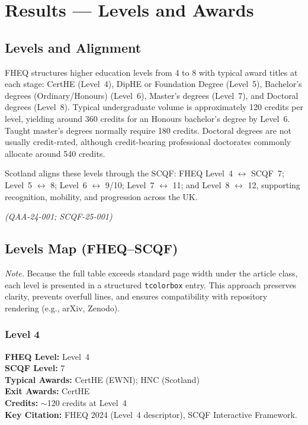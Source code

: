 \section{Results — Levels and Awards}

\subsection{Levels and Alignment}

FHEQ structures higher education levels from 4 to 8 with typical award titles at each stage: 
CertHE (Level~4), DipHE or Foundation Degree (Level~5), Bachelor’s degrees (Ordinary/Honours) 
(Level~6), Master’s degrees (Level~7), and Doctoral degrees (Level~8). Typical undergraduate 
volume is approximately 120 credits per level, yielding around 360 credits for an Honours 
bachelor’s degree by Level~6. Taught master’s degrees normally require 180 credits. Doctoral 
degrees are not usually credit-rated, although credit-bearing professional doctorates commonly 
allocate around 540 credits.

Scotland aligns these levels through the SCQF: FHEQ Level~4 $\leftrightarrow$ SCQF~7; 
Level~5 $\leftrightarrow$ 8; Level~6 $\leftrightarrow$ 9/10; Level~7 $\leftrightarrow$ 11; 
and Level~8 $\leftrightarrow$ 12, supporting recognition, mobility, and progression across 
the UK. 

\textit{(QAA-24-001; SCQF-25-001)}

\subsection{Levels Map (FHEQ–SCQF)}

\textit{Note.} Because the full table exceeds standard page width under the article
class, each level is presented in a structured \texttt{tcolorbox} entry. This
approach preserves clarity, prevents overfull lines, and ensures compatibility
with repository rendering (e.g., arXiv, Zenodo).

\subsubsection*{Level 4}

\begin{tcolorbox}
\textbf{FHEQ Level:} Level~4 \\
\textbf{SCQF Level:} 7 \\
\textbf{Typical Awards:} CertHE (EWNI); HNC (Scotland) \\
\textbf{Exit Awards:} CertHE \\
\textbf{Credits:} $\sim$120 credits at Level~4 \\
\textbf{Key Citation:} FHEQ 2024 (Level~4 descriptor), SCQF Interactive Framework.
\end{tcolorbox}

